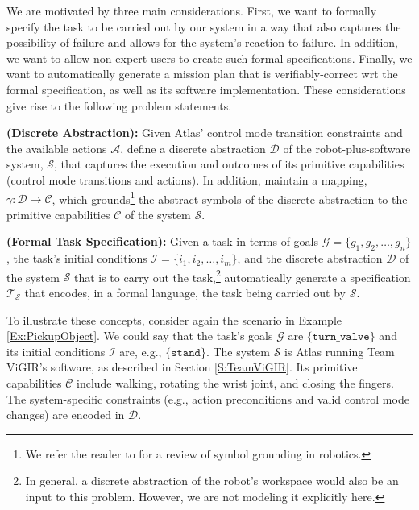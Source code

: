 
We are motivated by three main considerations.
First, we want to formally specify the task to be carried out by our system in a way that also captures the possibility of failure and allows for the system's reaction to failure.
In addition, we want to allow non-expert users to create such formal specifications.
Finally, we want to automatically generate a mission plan that is verifiably-correct \ac{wrt} the formal specification, as well as its software implementation.
These considerations give rise to the following problem statements.

\begin{myProblem}\label{DiscreteAbstractionProblem}
\textbf{(Discrete Abstraction):}
Given Atlas' control mode transition constraints and the available actions $\mathcal{A}$, define a discrete abstraction $\mathcal{D}$ of the robot-plus-software system, $\mathcal{S}$, that captures the execution and outcomes of its primitive capabilities (control mode transitions and actions).
In addition, maintain a mapping, $\gamma: \mathcal{D} \rightarrow \mathcal{C}$, which grounds\footnote{We refer the reader to \cite{Grounding2013} for a review of symbol grounding in robotics.}
 the abstract symbols of the discrete abstraction to the primitive capabilities $\mathcal{C}$ of the system $\mathcal{S}$.
\end{myProblem}

\begin{myProblem}\label{SpecificationProblem}
\textbf{(Formal Task Specification):}
Given a task in terms of goals $\mathcal{G} = \{ g_1, g_2, \ldots, g_n \}$, the task's initial conditions $\mathcal{I} = \{ i_1, i_2, \ldots, i_m \}$, and the discrete abstraction $\mathcal{D}$ of the system $\mathcal{S}$ that is to carry out the task,\footnote{In general, a discrete abstraction of the robot's workspace would also be an input to this problem. However, we are not modeling it explicitly here.}
 automatically generate a specification $\mathcal{T}_\mathcal{S}$ that encodes, in a formal language, the task being carried out by $\mathcal{S}$.
\end{myProblem}

To illustrate these concepts, consider again the scenario in Example \ref{Ex:PickupObject}. 
We could say that the task's goals $\mathcal{G}$ are $\{ \mathtt{turn\_valve} \}$ and its initial conditions $\mathcal{I}$ are, e.g., $\{ \mathtt{stand} \}$.
The system $\mathcal{S}$ is Atlas running Team ViGIR's software, as described in Section \ref{S:TeamViGIR}.
Its primitive capabilities $\mathcal{C}$ include walking, rotating the wrist joint, and closing the fingers.
The system-specific constraints (e.g., action preconditions and  valid control mode changes) are encoded in $\mathcal{D}$.

